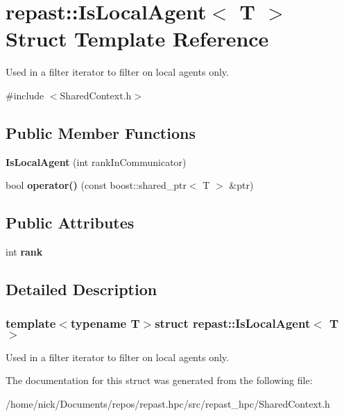 \hypertarget{structrepast_1_1_is_local_agent}{\section{repast\-:\-:Is\-Local\-Agent$<$ T $>$ Struct Template Reference}
\label{structrepast_1_1_is_local_agent}
}


Used in a filter iterator to filter on local agents only.  




{\ttfamily \#include $<$Shared\-Context.\-h$>$}

\subsection*{Public Member Functions}
\begin{DoxyCompactItemize}
\item 
\hypertarget{structrepast_1_1_is_local_agent_ad29d7ef8ffc1d238fd9468277b7c5f03}{{\bfseries Is\-Local\-Agent} (int rank\-In\-Communicator)}\label{structrepast_1_1_is_local_agent_ad29d7ef8ffc1d238fd9468277b7c5f03}

\item 
\hypertarget{structrepast_1_1_is_local_agent_a55212e849b4a59eebcf2a0bd1c9b3a96}{bool {\bfseries operator()} (const boost\-::shared\-\_\-ptr$<$ T $>$ \&ptr)}\label{structrepast_1_1_is_local_agent_a55212e849b4a59eebcf2a0bd1c9b3a96}

\end{DoxyCompactItemize}
\subsection*{Public Attributes}
\begin{DoxyCompactItemize}
\item 
\hypertarget{structrepast_1_1_is_local_agent_a2cb93804105c47d43f8085f4e699687a}{int {\bfseries rank}}\label{structrepast_1_1_is_local_agent_a2cb93804105c47d43f8085f4e699687a}

\end{DoxyCompactItemize}


\subsection{Detailed Description}
\subsubsection*{template$<$typename T$>$struct repast\-::\-Is\-Local\-Agent$<$ T $>$}

Used in a filter iterator to filter on local agents only. 

The documentation for this struct was generated from the following file\-:\begin{DoxyCompactItemize}
\item 
/home/nick/\-Documents/repos/repast.\-hpc/src/repast\-\_\-hpc/Shared\-Context.\-h\end{DoxyCompactItemize}

